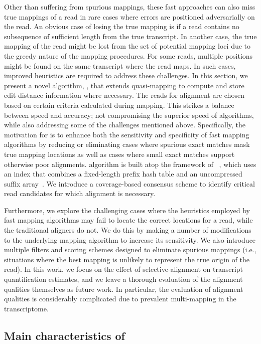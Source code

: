 Other than suffering from spurious mappings, these fast \nab approaches can also miss true 
mappings of a read in rare cases where errors are positioned adversarially on the read. 
An obvious case of losing the true mapping is if a read contains no subsequence of 
sufficient length from the true transcript. In another case, the true mapping of the 
read might be lost from the set of potential mapping loci due to the greedy nature of 
the mapping procedures. For some reads, multiple positions might be found on the same 
transcript where the read maps. In such cases, improved heuristics are required to address 
these challenges. In this section, we present a novel algorithm, \sla, that extends 
quasi-mapping to compute and store edit distance information where necessary. The reads 
for alignment are chosen based on certain criteria calculated during mapping.  This strikes 
a balance between speed and accuracy; not compromising the superior speed of \nab 
algorithms, while also addressing some of the challenges mentioned above. Specifically, 
the motivation for \sla is to enhance both the sensitivity and specificity of fast mapping  
algorithms by reducing or eliminating cases where spurious exact matches mask true mapping 
locations as well as cases where small exact matches support otherwise poor alignments. 
\Sla algorithm is built atop the framework of \rapmap~\citep{Srivastava2016rapmap}, 
which uses an index that combines a fixed-length prefix hash table and an uncompressed 
suffix array~\citep{Manber:1993:Suffix}.  We introduce a coverage-based consensus 
scheme to identify critical read candidates for which alignment is necessary.

Furthermore, we explore the challenging cases where the heuristics employed by fast mapping 
algorithms may fail to locate the correct locations for a read, while the traditional 
aligners do not. We do this by making a number of modifications to the underlying mapping 
algorithm to increase its sensitivity.  We also introduce multiple filters and scoring 
schemes designed to eliminate spurious mappings (i.e., situations where the best mapping 
is unlikely to represent the true origin of the read). In this work, we focus on the effect 
of selective-alignment on transcript quantification estimates, and we leave a thorough 
evaluation of the alignment qualities themselves as future work. In particular, the 
evaluation of alignment qualities is considerably complicated due to prevalent 
multi-mapping in the transcriptome.

\subsection{Main characteristics of \sla}

